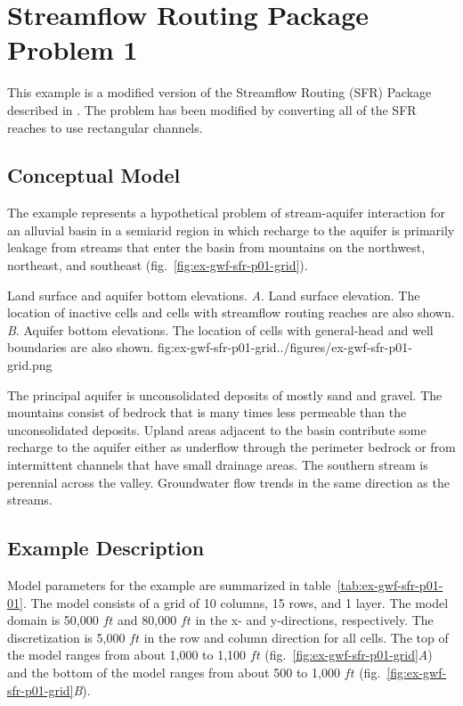 \section{Streamflow Routing Package Problem 1}

This example is a modified version of the Streamflow Routing (SFR) Package described in \cite{modflowsfr1pack}. The problem has been modified by converting all of the SFR reaches to use rectangular channels.                               

\subsection{Conceptual Model}

The example represents a hypothetical problem of stream-aquifer interaction for an alluvial basin in a semiarid region in which recharge to the aquifer is primarily leakage from streams that enter the basin from mountains on the northwest, northeast, and southeast (fig.~\ref{fig:ex-gwf-sfr-p01-grid}).

\begin{StandardFigure}{
                                     Land surface and aquifer bottom elevations. 
                                     \textit{A}. Land surface elevation. The location of inactive cells 
                                     and cells with streamflow routing reaches are also shown.
                                     \textit{B}. Aquifer bottom elevations. The location of cells with 
                                     general-head and well boundaries are also shown.
                                     }{fig:ex-gwf-sfr-p01-grid}{../figures/ex-gwf-sfr-p01-grid.png}
\end{StandardFigure}   

The principal aquifer is unconsolidated deposits of mostly sand and gravel. The mountains consist of bedrock that is many times less permeable than the unconsolidated deposits. Upland areas adjacent to the basin contribute some recharge to the aquifer either as underflow through the perimeter bedrock or from intermittent channels that have small drainage areas. The southern stream is perennial across the valley. Groundwater flow trends in the same direction as the streams.


\subsection{Example Description}
Model parameters for the example are summarized in table~\ref{tab:ex-gwf-sfr-p01-01}.  The model consists of a grid of 10 columns, 15 rows, and 1 layer. The model domain is  50,000 $ft$ and 80,000 $ft$ in the x- and y-directions, respectively. The discretization is 5,000 $ft$ in the row and column direction for all cells. The top of the model ranges from about 1,000 to 1,100 $ft$ (fig.~\ref{fig:ex-gwf-sfr-p01-grid}\textit{A}) and the bottom of the model ranges from about 500 to 1,000 $ft$ (fig.~\ref{fig:ex-gwf-sfr-p01-grid}\textit{B}).

